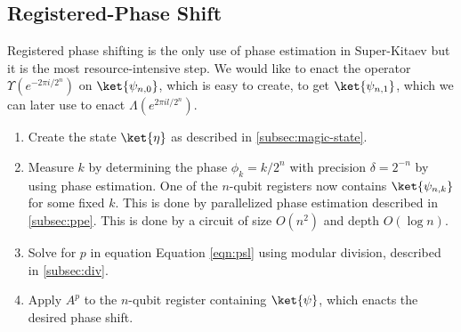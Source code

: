 \subsection{Registered-Phase Shift}
\label{subsec:phase-shift}

Registered phase shifting is the only use of phase estimation in
Super-Kitaev but it is the most resource-intensive step.
We would like to enact the operator $\Upsilon(e^{-2\pi i / 2^n})$ on
$\ket{\psi_{n,0}}$, which is easy to create, to get $\ket{\psi_{n,1}}$,
which we can later use to enact $\Lambda(e^{2\pi i l / 2^n})$.

\begin{enumerate}
\item Create the state $\ket{\eta}$ as described in \ref{subsec:magic-state}.
\item Measure $k$ by determining the phase $\phi_k = k/2^n$ with precision
$\delta = 2^{-n}$ by using phase estimation. One of the $n$-qubit registers
now contains $\ket{\psi_{n,k}}$ for some fixed $k$.
This is done by parallelized phase estimation described in
\ref{subsec:ppe}.
This is done by a circuit of size $O(n^2)$ and depth $O(\log n)$.
\item Solve for $p$ in equation
Equation \ref{eqn:psl} using modular division, described in
\ref{subsec:div}.
\item Apply $A^p$ to the $n$-qubit register containing $\ket{\psi}$, which
enacts the desired phase shift.
\end{enumerate}
